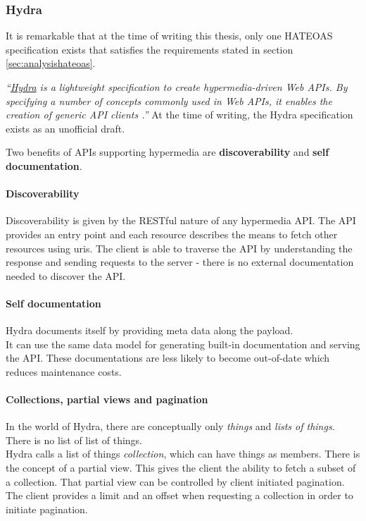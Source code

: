 \subsubsection{Hydra}
It is remarkable that at the time of writing this thesis, only one HATEOAS specification exists that satisfies the requirements stated in section \ref{sec:analysishateoas}.

\textit{``\href{http://www.hydra-cg.com/}{Hydra} is a lightweight specification to create hypermedia-driven Web APIs. By specifying a number of concepts commonly used in Web APIs, it enables the creation of generic API clients \citep{hydraspecs}.''} At the time of writing, the Hydra specification exists as an unofficial draft.

Two benefits of APIs supporting hypermedia are \textbf{discoverability} and \textbf{self documentation}.

\paragraph{Discoverability} Discoverability is given by the RESTful nature of any hypermedia API. The API provides an entry point and each resource describes the means to fetch other resources using \gls{uri}s. The client is able to traverse the API by understanding the response and sending requests to the server - there is no external documentation needed to discover the API.

\paragraph{Self documentation}
Hydra documents itself by providing meta data along the payload. \\
It can use the same data model for generating built-in documentation and serving the API. These documentations are less likely to become out-of-date which reduces maintenance costs.

\paragraph{Collections, partial views and pagination}
In the world of Hydra, there are conceptually only \textit{things} and \textit{lists of things}. There is no list of list of things. \\
Hydra calls a list of things \textit{collection}, which can have things as members. There is the concept of a partial view. This gives the client the ability to fetch a subset of a collection. That partial view can be controlled by client initiated \gls{pagination}. The client provides a limit and an offset when requesting a collection in order to initiate \gls{pagination}.

